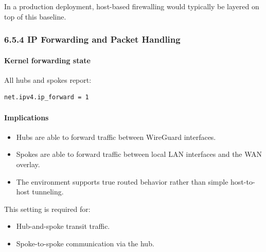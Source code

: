 \documentclass[11pt]{article}
\begin{document}
In a production deployment, host-based firewalling would typically be layered on top of this baseline.

%
%
%
\subsubsection{6.5.4 IP Forwarding and Packet Handling}

\paragraph{Kernel forwarding state}
All hubs and spokes report:

\begin{verbatim}
net.ipv4.ip_forward = 1
\end{verbatim}

\paragraph{Implications}
\begin{itemize}
  \item Hubs are able to forward traffic between WireGuard interfaces.
  \item Spokes are able to forward traffic between local LAN interfaces and the WAN overlay.
  \item The environment supports true routed behavior rather than simple host-to-host tunneling.
\end{itemize}

This setting is required for:
\begin{itemize}
  \item Hub-and-spoke transit traffic.
  \item Spoke-to-spoke communication via the hub.
\end{itemize}

%
%
%
\end{document}
